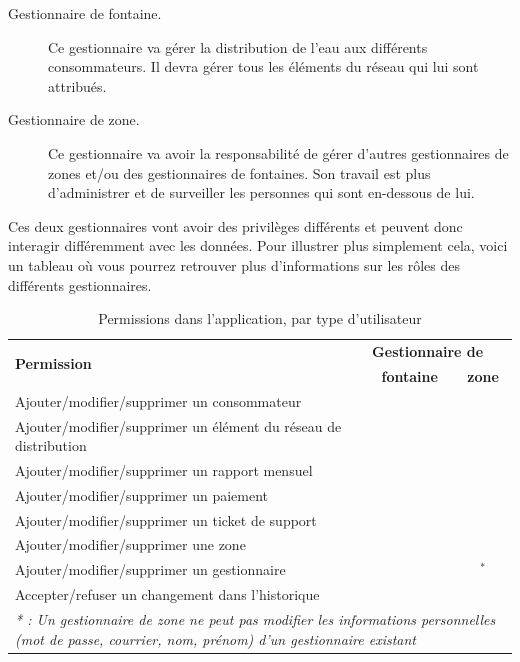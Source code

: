 \documentclass{EPL-master-thesis-covers-FR}
\newcommand{\cmark}{\ding{51}}%
\newcommand{\xmark}{\ding{55}}%
\begin{document}
				\begin{description}
					\item[Gestionnaire de fontaine.] Ce gestionnaire va gérer la distribution de l'eau aux différents consommateurs. Il devra gérer tous les éléments du réseau qui lui sont attribués.
					\item[Gestionnaire de zone.] Ce gestionnaire va avoir la responsabilité de gérer d'autres gestionnaires de zones et/ou des gestionnaires de fontaines. Son travail est plus d'administrer et de surveiller les personnes qui sont en-dessous de lui.			 
				\end{description}
				
				Ces deux gestionnaires vont avoir des privilèges différents et peuvent donc interagir différemment avec les données. Pour illustrer plus simplement cela, voici un tableau \cite{ref:haitiwater} où vous pourrez retrouver plus d'informations sur les rôles des différents gestionnaires. 
				\begin{table}[H]
					\centering
					\small
					\setlength\tabcolsep{2pt}
					\begin{tabular}{|l|c|c|}
						\hline
						\multirow{2}{*}{\textbf{Permission}} & \multicolumn{2}{l|}{\textbf{Gestionnaire de}} \\ \cline{2-3}
						 & \textbf{fontaine} & \textbf{zone} \\ \hline
						 Ajouter/modifier/supprimer un consommateur & \cmark & \cmark \\ \hline
						 Ajouter/modifier/supprimer un élément du réseau de distribution & \cmark & \cmark \\ \hline
						 Ajouter/modifier/supprimer un rapport mensuel & \cmark & \cmark \\ \hline
						 Ajouter/modifier/supprimer un paiement & \cmark & \cmark \\ \hline
						 Ajouter/modifier/supprimer un ticket de support & \cmark & \cmark \\ \hline
						 Ajouter/modifier/supprimer une zone & \xmark & \cmark \\ \hline
						 Ajouter/modifier/supprimer un gestionnaire & \xmark & \cmark$^{*}$ \\ \hline
						 Accepter/refuser un changement dans l'historique & \xmark & \cmark \\ \hline
						 \multicolumn{3}{p{\textwidth}}{\emph{* : Un gestionnaire de zone ne peut pas modifier les informations personnelles (mot de passe, courrier, nom, prénom) d'un gestionnaire existant}} \\
					\end{tabular}
					\caption{Permissions dans l'application, par type d'utilisateur}
					\label{tab:permissions}
				\end{table}
				
\end{document}
